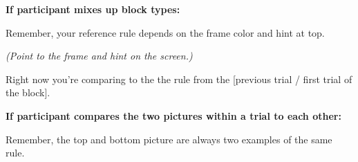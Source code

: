 \documentclass[11pt]{article}
\newcommand{\sayheader}{\textbf{\small\color{sayhead}}\par}
\begin{document}

\noindent\textbf{If participant mixes up block types:}
\begin{saybox}
\sayheader
Remember, your reference rule depends on the frame color and hint at top.

\textit{(Point to the frame and hint on the screen.)}

Right now you're comparing to the the rule from the [previous trial / first trial of the block].
\end{saybox}

\noindent\textbf{If participant compares the two pictures within a trial to each other:}
\begin{saybox}
\sayheader
Remember, the top and bottom picture are always two examples of the same rule.
\end{saybox}
\end{document}
